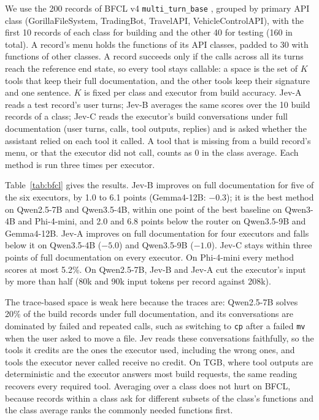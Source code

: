 \documentclass[11pt]{tea}
\newcommand{\JA}{Jev-A}
\newcommand{\JB}{Jev-B}
\newcommand{\JC}{Jev-C}
\newcommand{\tool}[1]{\texttt{#1}}
\begin{document}
We use the 200 records of BFCL v4 \texttt{multi\_turn\_base} \citep{bfcl}, grouped by primary API class (GorillaFileSystem, TradingBot, TravelAPI, VehicleControlAPI), with the first 10 records of each class for building and the other 40 for testing (160 in total). A record's menu holds the functions of its API classes, padded to 30 with functions of other classes. A record succeeds only if the calls across all its turns reach the reference end state, so every tool stays callable: a space is the set of $K$ tools that keep their full documentation, and the other tools keep their signature and one sentence. $K$ is fixed per class and executor from build accuracy. \JA{} reads a test record's user turns; \JB{} averages the same scores over the 10 build records of a class; \JC{} reads the executor's build conversations under full documentation (user turns, calls, tool outputs, replies) and is asked whether the assistant relied on each tool it called. A tool that is missing from a build record's menu, or that the executor did not call, counts as 0 in the class average. Each method is run three times per executor.



Table~\ref{tab:bfcl} gives the results. \JB{} improves on full documentation for five of the six executors, by 1.0 to 6.1 points (Gemma4-12B: $-0.3$); it is the best method on Qwen2.5-7B and Qwen3.5-4B, within one point of the best baseline on Qwen3-4B and Phi-4-mini, and 2.0 and 6.8 points below the router on Qwen3.5-9B and Gemma4-12B. \JA{} improves on full documentation for four executors and falls below it on Qwen3.5-4B ($-5.0$) and Qwen3.5-9B ($-1.0$). \JC{} stays within three points of full documentation on every executor. On Phi-4-mini every method scores at most 5.2\%. On Qwen2.5-7B, \JB{} and \JA{} cut the executor's input by more than half (80k and 90k input tokens per record against 208k).

The trace-based space is weak here because the traces are: Qwen2.5-7B solves 20\% of the build records under full documentation, and its conversations are dominated by failed and repeated calls, such as switching to \tool{cp} after a failed \tool{mv} when the user asked to move a file. Jev reads these conversations faithfully, so the tools it credits are the ones the executor used, including the wrong ones, and tools the executor never called receive no credit. On TGB, where tool outputs are deterministic and the executor answers most build requests, the same reading recovers every required tool. Averaging over a class does not hurt on BFCL, because records within a class ask for different subsets of the class's functions and the class average ranks the commonly needed functions first.
\end{document}
